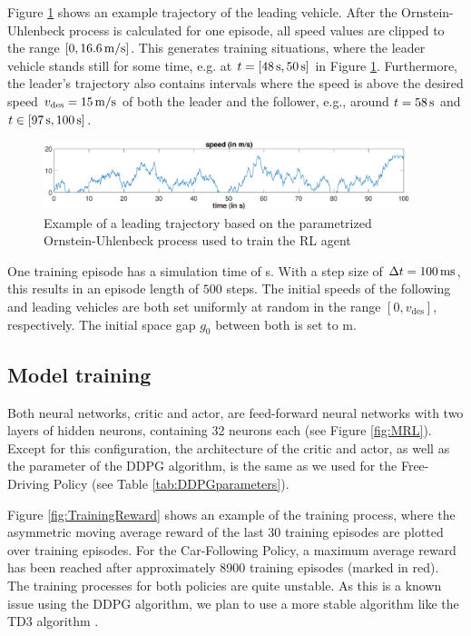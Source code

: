 \documentclass[review]{elsarticle}
\providecommand{\sub}[1]{_{\mathrm{#1}}}  %
\providecommand{\3}{{\ss}}
\begin{document}
	
	Figure \ref{fig:AR1process} shows an example trajectory of the leading
	vehicle. After the Ornstein-Uhlenbeck process is calculated for one
	episode, all speed values are clipped to the range $[0,\unit[16.6]{m/s}]$. This generates
	training situations, where the leader vehicle stands still for some
	time, e.g. at $t= [\unit[48]{s}, \unit[50]{s}]$ in Figure
	\ref{fig:AR1process}. Furthermore, the leader's trajectory
	also contains intervals where the speed is above the desired speed
	$v\sub{des}=\unit[15]{m/s}$ of both the leader and the follower,
	e.g., around $t=\unit[58]{s}$ and $t\in [\unit[97]{s},
	\unit[100]{s}]$.
	\begin{figure}
		\centering
		\includegraphics[width=0.95\textwidth]{images/AR1process}
		\caption{Example of a leading trajectory based on the parametrized Ornstein-Uhlenbeck process used to train the RL agent}
		\label{fig:AR1process}
	\end{figure}
	One training episode has a simulation time of \unit[50]{s}.  With a step size of
	$\Delta t=\unit[100]{ms}$, this results in an episode length of $500$
	steps. The initial speeds of the following and leading vehicles are both
	set uniformly at random in the range $[0,v\sub{des}]$,
	respectively. The initial space gap $g_0$ between both is set to \unit[120]{m}. 
	
	\subsection{Model training}
	Both neural networks, critic and actor, are feed-forward neural networks with two layers of hidden neurons, containing 32 neurons each (see Figure \ref{fig:MRL}). Except for this configuration, the architecture of the critic and actor, as well as the parameter of the DDPG algorithm, is the same as we used for the Free-Driving Policy (see Table \ref{tab:DDPGparameters}).
	
	Figure \ref{fig:TrainingReward} shows an example of the training
	process, where the asymmetric moving average reward of the last 30
	training episodes are plotted over training episodes. For the
	Car-Following Policy, a maximum average reward has been reached after
	approximately 8900 training episodes (marked in red). The training processes for both policies are quite unstable. As this is a known issue using the DDPG algorithm, we plan to use a more stable algorithm like the TD3 algorithm \citep{TD3}.    
	
\end{document}
